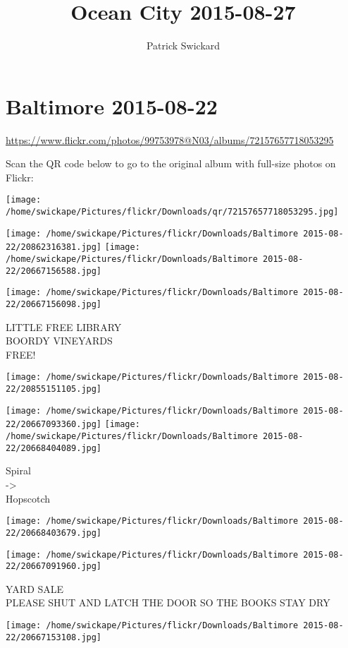 \documentclass[10pt,letterpaper]{article}
\title{Ocean City 2015-08-27}
\author{Patrick Swickard}
\date{}
\begin{document}
\section*{Baltimore 2015-08-22}

\url{https://www.flickr.com/photos/99753978@N03/albums/72157657718053295}

Scan the QR code below to go to the original album with full-size photos on Flickr:

\texttt{[image: /home/swickape/Pictures/flickr/Downloads/qr/72157657718053295.jpg]}
\pagebreak

\texttt{[image: /home/swickape/Pictures/flickr/Downloads/Baltimore 2015-08-22/20862316381.jpg]}
\texttt{[image: /home/swickape/Pictures/flickr/Downloads/Baltimore 2015-08-22/20667156588.jpg]}

\vspace{0.25in}
\texttt{[image: /home/swickape/Pictures/flickr/Downloads/Baltimore 2015-08-22/20667156098.jpg]}

LITTLE FREE LIBRARY\\
BOORDY VINEYARDS\\
FREE!
\pagebreak

\texttt{[image: /home/swickape/Pictures/flickr/Downloads/Baltimore 2015-08-22/20855151105.jpg]}

\vspace{0.25in}
\texttt{[image: /home/swickape/Pictures/flickr/Downloads/Baltimore 2015-08-22/20667093360.jpg]}
\texttt{[image: /home/swickape/Pictures/flickr/Downloads/Baltimore 2015-08-22/20668404089.jpg]}

Spiral\\
{-}>\\
Hopscotch
\pagebreak

\texttt{[image: /home/swickape/Pictures/flickr/Downloads/Baltimore 2015-08-22/20668403679.jpg]}

\vspace{0.25in}
\texttt{[image: /home/swickape/Pictures/flickr/Downloads/Baltimore 2015-08-22/20667091960.jpg]}

YARD SALE\\
PLEASE SHUT AND LATCH THE DOOR SO THE BOOKS STAY DRY
\pagebreak

\texttt{[image: /home/swickape/Pictures/flickr/Downloads/Baltimore 2015-08-22/20667153108.jpg]}
\end{document}

